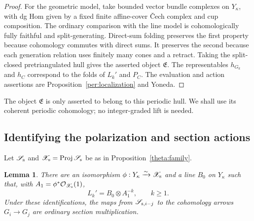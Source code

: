 \documentclass[11pt]{article}
\newtheorem{lemma}[theorem]{Lemma}
\theoremstyle{definition}
\theoremstyle{remark}
\DeclareMathOperator{\Proj}{Proj}
\newcommand{\cO}{\mathcal O}
\numberwithin{equation}{section}
\begin{document}
\begin{proof}
For the geometric model, take bounded vector bundle complexes on
$Y_\kappa$, with dg Hom given by a fixed finite affine-cover \v Cech
complex and cup composition.  The ordinary comparison with the line
model is cohomologically fully faithful and split-generating.
Direct-sum folding preserves the first property because cohomology
commutes with direct sums.  It preserves the second because each
generation relation uses finitely many cones and a retract.  Taking
the split-closed pretriangulated hull gives the asserted object
$\mathfrak E$.  The representables $h_{G_k}$ and $h_C$ correspond to
the folds of $L_k'$ and $P_C$.  The evaluation and action assertions
are Proposition~\ref{per:localization} and Yoneda.
\end{proof}

The object $\mathfrak E$ is only asserted to belong to this periodic
hull.  We shall use its coherent periodic cohomology; no
integer-graded lift is needed.

\subsection{Identifying the polarization and section actions}

Let $\mathscr S_{\rm s}$ and
$\mathscr X_{\rm s}=\Proj\mathscr S_{\rm s}$ be as in
Proposition~\ref{theta:family}.

\begin{lemma}
\label{per:section-ring}
There are an isomorphism
$\phi:Y_\kappa\xrightarrow{\sim}\mathscr X_{\rm s}$ and a line
$B_0$ on $Y_\kappa$ such that, with
$A_1=\phi^*\cO_{\mathscr X_{\rm s}}(1)$,
\begin{equation}
 L_k'=B_0\otimes A_1^{-k},\qquad k\ge1.
 \label{per:line-progression}
\end{equation}
Under these identifications, the maps from
$\mathscr S_{{\rm s},i-j}$ to the cohomology arrows $G_i\to G_j$
are ordinary section multiplication.
\end{lemma}
\end{document}
